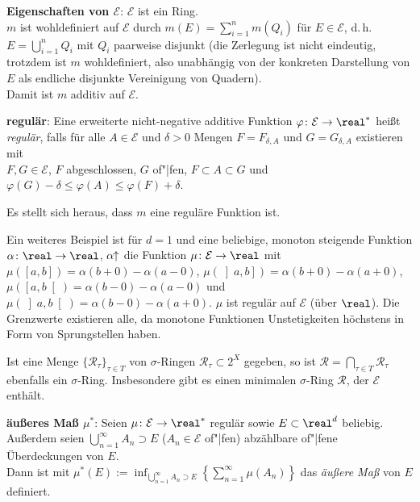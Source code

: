 \textbf{Eigenschaften von $\mathcal{E}$}:
$\mathcal{E}$ ist ein Ring. \\
$m$ ist wohldefiniert auf $\mathcal{E}$ durch
$m(E) = \sum_{i=1}^n m(Q_i)$ für $E \in \mathcal{E}$,
d.\,h. $E = \bigcup_{i=1}^n Q_i$ mit $Q_i$ paarweise disjunkt
(die Zerlegung ist nicht eindeutig, trotzdem ist $m$ wohldefiniert, also
unabhängig von der konkreten Darstellung von $E$ als
endliche disjunkte Vereinigung von Quadern). \\
Damit ist $m$ additiv auf $\mathcal{E}$.

\linie

\textbf{regulär}:
Eine erweiterte nicht-negative additive Funktion
$\varphi\colon \mathcal{E} \rightarrow \real^\ast$ heißt \emph{regulär}, falls
für alle $A \in \mathcal{E}$ und $\delta > 0$ Mengen $F = F_{\delta,A}$ und
$G = G_{\delta,A}$ existieren mit \\
$F, G \in \mathcal{E}$, \qquad
$F$ abgeschlossen, $G$ of"|fen, \qquad
$F \subset A \subset G$ \quad und \quad
$\varphi(G) - \delta \le \varphi(A) \le \varphi(F) + \delta$.

Es stellt sich heraus, dass $m$ eine reguläre Funktion ist.

Ein weiteres Beispiel ist für $d = 1$ und
eine beliebige, monoton steigende Funktion
$\alpha\colon \real \to \real$, $\alpha\!\!\uparrow$ die Funktion
$\mu\colon \mathcal{E} \rightarrow \real$ mit
$\mu(\left[a,b\right]) = \alpha(b + 0) - \alpha(a - 0)$,
$\mu(\left]a,b\right]) = \alpha(b + 0) - \alpha(a + 0)$,
$\mu(\left[a,b\right[) = \alpha(b - 0) - \alpha(a - 0)$ und
$\mu(\left]a,b\right[) = \alpha(b - 0) - \alpha(a + 0)$.
$\mu$ ist regulär auf $\mathcal{E}$ (über $\real$).
Die Grenzwerte existieren alle, da monotone Funktionen Unstetigkeiten höchstens
in Form von Sprungstellen haben.

Ist eine Menge $\{\mathcal{R}_\tau\}_{\tau \in T}$ von $\sigma$-Ringen
$\mathcal{R}_\tau \subset 2^X$ gegeben, so ist
$\mathcal{R} = \bigcap_{\tau \in T} \mathcal{R}_\tau$ ebenfalls ein
$\sigma$-Ring.
Insbesondere gibt es einen minimalen $\sigma$-Ring $\mathcal{R}$, der
$\mathcal{E}$ enthält.

\linie

\textbf{äußeres Maß $\mu^\ast$}:
Seien $\mu\colon \mathcal{E} \rightarrow \real^\ast$ regulär
sowie $E \subset \real^d$ beliebig. \\
Außerdem seien $\bigcup_{n=1}^\infty A_n \supset E$
($A_n \in \mathcal{E}$ of"|fen) abzählbare of"|fene Überdeckungen von $E$. \\
Dann ist mit $\mu^\ast(E) := \inf_{\bigcup_{n=1}^\infty A_n \supset E}
\left\{\sum_{n=1}^\infty \mu(A_n)\right\}$ das \emph{äußere Maß} von
$E$ definiert.

